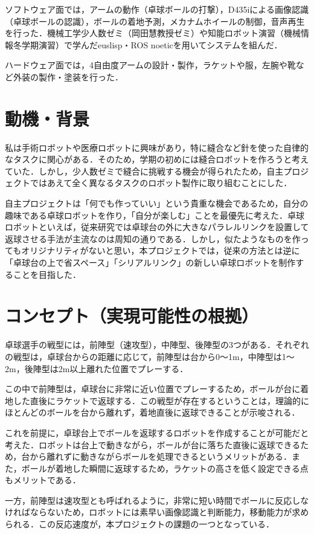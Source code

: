 \documentclass[10pt, oneside, titlepage]{ltjarticle}  %
\begin{document}
ソフトウェア面では，アームの動作（卓球ボールの打撃），D435iによる画像認識（卓球ボールの認識），ボールの着地予測，メカナムホイールの制御，音声再生を行った．機械工学少人数ゼミ（岡田慧教授ゼミ）や知能ロボット演習（機械情報冬学期演習）で学んだeuslisp・ROS noeticを用いてシステムを組んだ．

ハードウェア面では，4自由度アームの設計・製作，ラケットや服，左腕や靴など外装の製作・塗装を行った．

\section{動機・背景}
私は手術ロボットや医療ロボットに興味があり，特に縫合など針を使った自律的なタスクに関心がある．そのため，学期の初めには縫合ロボットを作ろうと考えていた．しかし，少人数ゼミで縫合に挑戦する機会が得られたため，自主プロジェクトではあえて全く異なるタスクのロボット製作に取り組むことにした．

自主プロジェクトは「何でも作っていい」という貴重な機会であるため，自分の趣味である卓球ロボットを作り，「自分が楽しむ」ことを最優先に考えた．卓球ロボットといえば，従来研究では卓球台の外に大きなパラレルリンクを設置して返球させる手法が主流なのは周知の通りである．しかし，似たようなものを作ってもオリジナリティがないと思い，本プロジェクトでは，従来の方法とは逆に「卓球台の上で省スペース」「シリアルリンク」の新しい卓球ロボットを制作することを目指した．

\section{コンセプト（実現可能性の根拠）}
卓球選手の戦型には，前陣型（速攻型），中陣型、後陣型の3つがある．それぞれの戦型は，卓球台からの距離に応じて，前陣型は台から0〜1m，中陣型は1〜2m，後陣型は2m以上離れた位置でプレーする．

この中で前陣型は，卓球台に非常に近い位置でプレーするため，ボールが台に着地した直後にラケットで返球する．この戦型が存在するということは，理論的にほとんどのボールを台から離れず，着地直後に返球できることが示唆される．

これを前提に，卓球台上でボールを返球するロボットを作成することが可能だと考えた．ロボットは台上で動きながら，ボールが台に落ちた直後に返球できるため，台から離れずに動きながらボールを処理できるというメリットがある．また，ボールが着地した瞬間に返球するため，ラケットの高さを低く設定できる点もメリットである．

一方，前陣型は速攻型とも呼ばれるように，非常に短い時間でボールに反応しなければならないため，ロボットには素早い画像認識と判断能力，移動能力が求められる．この反応速度が，本プロジェクトの課題の一つとなっている．
\end{document}

